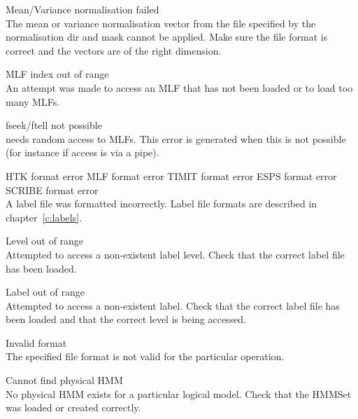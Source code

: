 \begin{itemize}
\begin{itemize}
    Mean/Variance normalisation failed\\
        The mean or variance normalisation vector from the file
        specified by the normalisation dir and mask cannot be applied.
        Make sure the file format is correct and the vectors are of
        the right dimension.

\end{itemize}


\begin{itemize}
    MLF index out of range\\
        An attempt was made to access an MLF that has not been loaded or to 
        load too many MLFs.

    fseek/ftell not possible\\
         needs random access to MLFs.  This error is generated
        when this is not possible (for instance if access is via a pipe).

    HTK format error
    MLF format error
    TIMIT format error
 ESPS format error
    SCRIBE format error\\
        A label file was formatted incorrectly.  Label
        file formats are described in chapter~\ref{c:labels}.

    Level out of range\\
        Attempted to access a non-existent label level.  Check that the correct
        label file has been loaded.

    Label out of range\\
        Attempted to access a non-existent label.  Check that the correct
        label file has been loaded and that the correct level is being 
        accessed.

    Invalid format\\
        The specified file format is not valid for the particular operation.

\end{itemize}


\begin{itemize}
    Cannot find physical HMM\\
        No physical HMM exists for a particular logical model.  Check that the
        HMMSet was loaded or created correctly.


\end{itemize}
\end{itemize}
